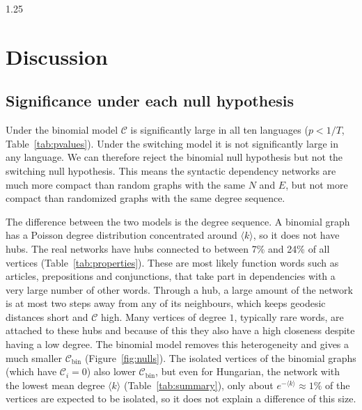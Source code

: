 \documentclass[12pt]{article}
\newcommand{\metric}{\mathcal{C}}
\begin{document}
\begin{spacing}{1.25}
\begin{table}[H]
    \centering
    
    \caption{Mean local clustering coefficient $C_{WS}$ and degree assortativity $r$ in the real networks and in graphs from the switching model.}
    \label{tab:structure}
\end{table}


\section{Discussion}

\subsection{Significance under each null hypothesis}
\label{sec:sig}
Under the binomial model $\metric$ is significantly large in all ten languages ($p<1/T$, Table~\ref{tab:pvalues}). Under the switching model it is not significantly large in any language. We can therefore reject the binomial null hypothesis but not the switching null hypothesis. This means the syntactic dependency networks are much more compact than random graphs with the same $N$ and $E$, but not more compact than randomized graphs with the same degree sequence.

The difference between the two models is the degree sequence. A binomial graph has a Poisson degree distribution concentrated around $\langle k\rangle$, so it does not have hubs. The real networks have hubs connected to between 7\% and 24\% of all vertices (Table~\ref{tab:properties}). These are most likely function words such as articles, prepositions and conjunctions, that take part in dependencies with a very large number of other words. Through a hub, a large amount of the network is at most two steps away from any of its neighbours, which keeps geodesic distances short and $\metric$ high. Many vertices of degree $1$, typically rare words, are attached to these hubs and because of this they also have a high closeness despite having a low degree. The binomial model removes this heterogeneity and gives a much smaller $\metric_{\mathrm{bin}}$ (Figure~\ref{fig:nulls}). The isolated vertices of the binomial graphs (which have $\metric_i=0$) also lower $\metric_{\mathrm{bin}}$, but even for Hungarian, the network with the lowest mean degree $\langle k\rangle$ (Table~\ref{tab:summary}), only about $e^{-\langle k\rangle}\approx 1\%$ of the vertices are expected to be isolated, so it does not explain a difference of this size.


\end{spacing}
\end{document}
